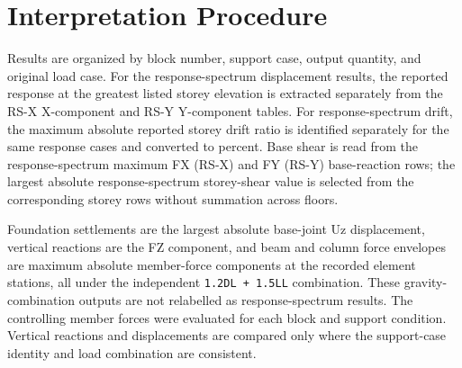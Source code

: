\section{Interpretation Procedure}
Results are organized by block number, support case, output quantity, and original load case. For the response-spectrum displacement results, the reported response at the greatest listed storey elevation is extracted separately from the RS-X X-component and RS-Y Y-component tables. For response-spectrum drift, the maximum absolute reported storey drift ratio is identified separately for the same response cases and converted to percent. Base shear is read from the response-spectrum maximum FX (RS-X) and FY (RS-Y) base-reaction rows; the largest absolute response-spectrum storey-shear value is selected from the corresponding storey rows without summation across floors.

Foundation settlements are the largest absolute base-joint Uz displacement, vertical reactions are the FZ component, and beam and column force envelopes are maximum absolute member-force components at the recorded element stations, all under the independent \texttt{1.2DL + 1.5LL} combination. These gravity-combination outputs are not relabelled as response-spectrum results. The controlling member forces were evaluated for each block and support condition. Vertical reactions and displacements are compared only where the support-case identity and load combination are consistent.
